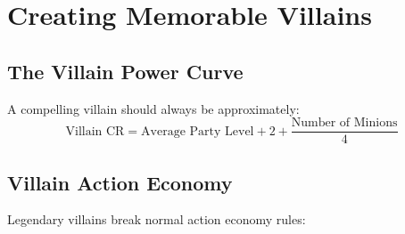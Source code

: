 \documentclass[11pt,letterpaper,openany]{book}
\begin{document}
\section{Creating Memorable Villains}

\subsection{The Villain Power Curve}

A compelling villain should always be approximately:
\begin{equation}
\text{Villain CR} = \text{Average Party Level} + 2 + \frac{\text{Number of Minions}}{4}
\end{equation}

\subsection{Villain Action Economy}

Legendary villains break normal action economy rules:
\end{document}
